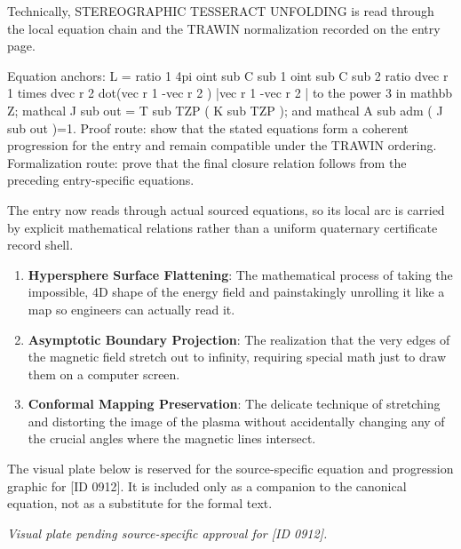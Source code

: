 Technically, STEREOGRAPHIC TESSERACT UNFOLDING is read through the local equation chain and the TRAWIN normalization recorded on the entry page.

Equation anchors: L = ratio 1 4pi oint sub C sub 1 oint sub C sub 2 ratio dvec r 1 times dvec r 2 dot(vec r 1 -vec r 2 ) |vec r 1 -vec r 2 | to the power 3 in mathbb Z; mathcal J sub out = T sub TZP ( K sub TZP ); and mathcal A sub adm ( J sub out )=1. Proof route: show that the stated equations form a coherent progression for the entry and remain compatible under the TRAWIN ordering. Formalization route: prove that the final closure relation follows from the preceding entry-specific equations.

The entry now reads through actual sourced equations, so its local arc is carried by explicit mathematical relations rather than a uniform quaternary certificate record shell.
\endgroup

\begin{enumerate}[leftmargin=1.6em,itemsep=6pt,topsep=4pt]
\item \textbf{Hypersphere Surface Flattening}: The mathematical process of taking the impossible, 4D shape of the energy field and painstakingly unrolling it like a map so engineers can actually read it.
\item \textbf{Asymptotic Boundary Projection}: The realization that the very edges of the magnetic field stretch out to infinity, requiring special math just to draw them on a computer screen.
\item \textbf{Conformal Mapping Preservation}: The delicate technique of stretching and distorting the image of the plasma without accidentally changing any of the crucial angles where the magnetic lines intersect.
\end{enumerate}

\begingroup\footnotesize\sloppy
The visual plate below is reserved for the source-specific equation and progression graphic for [ID 0912]. It is included only as a companion to the canonical equation, not as a substitute for the formal text.
\par\endgroup
\begingroup\footnotesize\itshape
Visual plate pending source-specific approval for [ID 0912].
\par\endgroup

